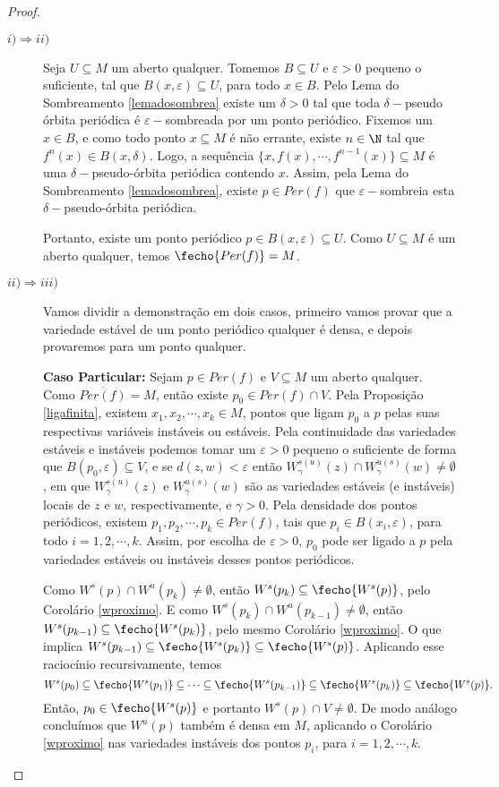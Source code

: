 \begin{proof}\begin{description}
\item[$i)\Rightarrow ii)$] Seja $U\subseteq M$ um aberto qualquer. Tomemos $B\subseteq U$ e $\varepsilon>0$ pequeno o suficiente, tal que $B(x,\varepsilon)\subseteq U$, para todo $x\in B$. Pelo Lema do Sombreamento \ref{lemadosombrea} existe um $\delta>0$ tal que toda $\delta-$pseudo órbita periódica é $\varepsilon-$sombreada por um ponto periódico. Fixemos um $x\in B$, e como todo ponto $x\subseteq M$ é não errante, existe $n\in\N$ tal que $f^n(x)\in B(x,\delta)$. Logo, a sequência $\{x,f(x),\cdots,f^{n-1}(x)\}\subseteq M$ é uma $\delta-$pseudo-órbita periódica contendo $x$. Assim, pela Lema do Sombreamento \ref{lemadosombrea}, existe $p\in Per(f)$ que $\varepsilon-$sombreia esta $\delta-$pseudo-órbita periódica.

Portanto, existe um ponto periódico $p\in B(x,\varepsilon)\subseteq U$. Como $U\subseteq M$ é um aberto qualquer, temos $\fecho{Per(f)}=M$.

\item[$ii)\Rightarrow iii)$] Vamos dividir a demonstração em dois casos, primeiro vamos provar que a variedade estável de um ponto periódico qualquer é densa, e depois provaremos para um ponto qualquer.

\textbf{Caso Particular:} Sejam $p\in Per(f)$ e $V\subseteq M$ um aberto qualquer. Como $\overline{Per(f)}=M$, então existe $p_0\in Per(f)\cap V$. Pela Proposição \ref{ligafinita}, existem $x_1,x_2,\cdots,x_k\in M$, pontos que ligam $p_0$ a $p$ pelas suas respectivas variáveis instáveis ou estáveis. Pela continuidade das variedades estáveis e instáveis podemos tomar um $\varepsilon>0$ pequeno o suficiente de forma que $B(p_0,\varepsilon)\subseteq V$, e se $d(z,w)<\varepsilon$ então $W^{s(u)}_{\gamma}(z)\cap W^{u(s)}_{\gamma}(w)\neq \emptyset$, em que  $W^{s(u)}_{\gamma}(z)$ e $W^{u(s)}_{\gamma}(w)$ são as variedades estáveis (e instáveis) locais de $z$ e $w$, respectivamente, e $\gamma>0$. Pela densidade dos pontos periódicos, existem $p_1,p_2,\cdots,p_k\in Per(f)$, tais que $p_i\in B(x_i,\varepsilon)$, para todo $i=1,2,\cdots,k$. Assim, por escolha de $\varepsilon>0$, $p_0$ pode ser ligado a $p$ pela variedades estáveis ou instáveis desses pontos periódicos. 

Como $W^s(p)\cap W^u(p_k)\neq\emptyset$, então $W^s(p_k)\subseteq\fecho{W^s(p)}$, pelo Corolário \ref{wproximo}. E como $W^s(p_k)\cap W^u(p_{k-1})\neq\emptyset$, então $W^s(p_{k-1})\subseteq\fecho{W^s(p_k)}$, pelo mesmo Corolário \ref{wproximo}. O que implica ${W^s(p_{k-1})}\subseteq\fecho{W^s(p_k)}\subseteq\fecho{W^s(p)}$. Aplicando esse raciocínio recursivamente, temos $$W^s(p_0)\subseteq\fecho{W^s(p_1)}\subseteq\cdots\subseteq\fecho{W^s(p_{k-1})}\subseteq\fecho{W^s(p_k)}\subseteq\fecho{W^s(p)}.$$ Então, $p_0\in\fecho{W^s(p)}$ e portanto $W^s(p)\cap V\neq\emptyset$.
De modo análogo concluímos que $W^u(p)$ também é densa em $M$, aplicando o Corolário \ref{wproximo} nas variedades instáveis dos pontos $p_i$, para $i=1,2,\cdots,k$.


\end{description}
\end{proof}

